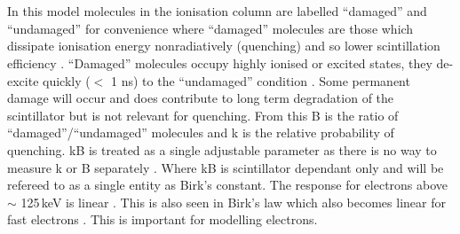 \\\\In this model molecules in the ionisation column are labelled ``damaged'' and ``undamaged'' for convenience where ``damaged'' molecules are those which dissipate ionisation energy nonradiatively (quenching) and so lower scintillation efficiency\cite{craun_1970} \cite{knoll_2010}. ``Damaged'' molecules occupy highly ionised or excited states, they de-excite quickly ($<$ 1 ns) to the ``undamaged'' condition \cite{craun_1970}. Some permanent damage will occur and does contribute to long term degradation of the scintillator but is not relevant for quenching\cite{craun_1970}. From this B is the ratio of ``damaged''/``undamaged'' molecules and k is the relative probability of quenching. kB is treated as a single adjustable parameter as there is no way to measure k or B separately \cite{craun_1970} \cite{knoll_2010}. Where kB is scintillator dependant only and will be refereed to as a single entity as Birk's constant. The response for electrons above $\sim$ 125\,keV is linear \cite{craun_1970}. This is also seen in Birk's law which also becomes linear for fast electrons \cite{knoll_2010}. This is important for modelling electrons. 
